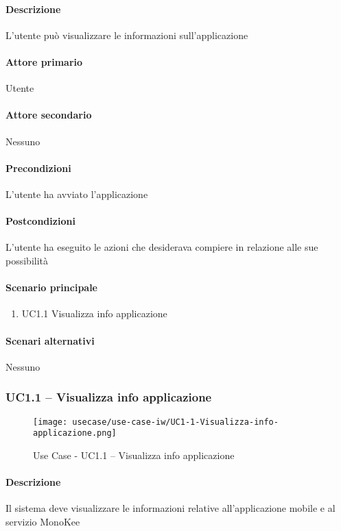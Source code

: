 \paragraph{Descrizione}  L’utente può visualizzare le informazioni sull’applicazione 
\paragraph{Attore primario}  Utente
\paragraph{Attore secondario}  Nessuno
\paragraph{Precondizioni}  L’utente ha avviato l’applicazione
\paragraph{Postcondizioni}  L’utente ha eseguito le azioni che desiderava compiere in relazione alle sue possibilità
\paragraph{Scenario principale}  
    \begin{enumerate}
        \item UC1.1 Visualizza info applicazione
    \end{enumerate}
\paragraph{Scenari alternativi}  Nessuno


\subsubsection{UC1.1 – Visualizza info applicazione}
\begin{figure}[!htbp] 
    \centering 
    \texttt{[image: usecase/use-case-iw/UC1-1-Visualizza-info-applicazione.png]} 
    \caption{Use Case - UC1.1 – Visualizza info applicazione}
\end{figure}

\paragraph{Descrizione}  Il sistema deve visualizzare le informazioni relative all’applicazione mobile e al servizio MonoKee  
